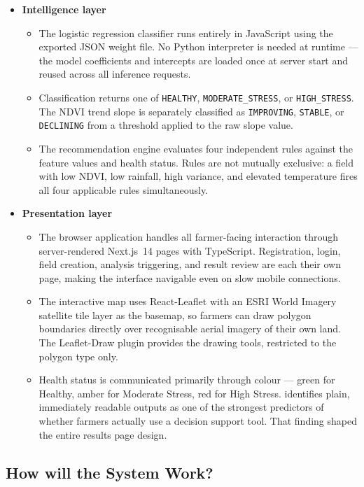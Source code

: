 \begin{itemize}
  \item \textbf{Intelligence layer}
    \begin{itemize}
      \item[-] The logistic regression classifier runs entirely in JavaScript using the exported JSON weight file. No Python interpreter is needed at runtime — the model coefficients and intercepts are loaded once at server start and reused across all inference requests. \citep{pedregosa2011}
      \item[-] Classification returns one of \texttt{HEALTHY}, \texttt{MODERATE\_STRESS}, or \texttt{HIGH\_STRESS}. The NDVI trend slope is separately classified as \texttt{IMPROVING}, \texttt{STABLE}, or \texttt{DECLINING} from a threshold applied to the raw slope value.
      \item[-] The recommendation engine evaluates four independent rules against the feature values and health status. Rules are not mutually exclusive: a field with low NDVI, low rainfall, high variance, and elevated temperature fires all four applicable rules simultaneously. \citep{liakos2018}
    \end{itemize}

  \item \textbf{Presentation layer}
    \begin{itemize}
      \item[-] The browser application handles all farmer-facing interaction through server-rendered Next.js~14 pages with TypeScript. Registration, login, field creation, analysis triggering, and result review are each their own page, making the interface navigable even on slow mobile connections.
      \item[-] The interactive map uses React-Leaflet with an ESRI World Imagery satellite tile layer as the basemap, so farmers can draw polygon boundaries directly over recognisable aerial imagery of their own land. The Leaflet-Draw plugin provides the drawing tools, restricted to the polygon type only.
      \item[-] Health status is communicated primarily through colour — green for Healthy, amber for Moderate Stress, red for High Stress. \citet{rose2016} identifies plain, immediately readable outputs as one of the strongest predictors of whether farmers actually use a decision support tool. That finding shaped the entire results page design.
    \end{itemize}
\end{itemize}

\subsection{How will the System Work?}

